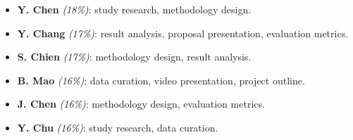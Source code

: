 \documentclass[conference]{IEEEtran}
\begin{document}
\begin{itemize}
  \item \textbf{Y. Chen} \textit{(18\%)}: study research, methodology design.
  \item \textbf{Y. Chang} \textit{(17\%)}: result analysis, proposal presentation, evaluation metrics.
  \item \textbf{S. Chien} \textit{(17\%)}: methodology design, result analysis.
  \item \textbf{B. Mao} \textit{(16\%)}: data curation, video presentation, project outline.
  \item \textbf{J. Chen} \textit{(16\%)}: methodology design, evaluation metrics.
  \item \textbf{Y. Chu} \textit{(16\%)}: study research, data curation.
\end{itemize}



\end{document}
